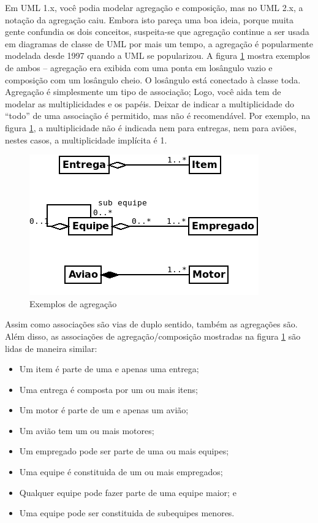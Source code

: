 \documentclass[
	article,			%
	12pt,				%
	openright,
	twoside,			%
	a4paper,			%
	english,			%
	french,
	brazil,				%
	sumario=tradicional
	]{abntex2}
\begin{document}
Em UML 1.x, você podia modelar agregação e composição, mas no UML 2.x, a notação da agregação caiu. Embora isto pareça uma boa ideia, porque muita gente confundia os dois conceitos, suspeita-se que agregação continue a ser usada em diagramas de classe de UML por mais um tempo, a agregação é popularmente modelada desde 1997 quando a UML se popularizou. A figura \ref{fig:uml8} mostra exemplos de ambos -- agregação era exibida com uma ponta em losângulo vazio e composição com um losângulo cheio. O losângulo está conectado à classe toda. Agregação é simplesmente um tipo de associação; Logo, você aida tem de modelar as multiplicidades e os papéis. Deixar de indicar a multiplicidade do ``todo'' de uma associação é permitido, mas não é recomendável. Por exemplo, na figura \ref{fig:uml8}, a multiplicidade não é indicada nem para entregas, nem para aviões, nestes casos, a multiplicidade implícita é 1.

\begin{figure}[h]
\begin{center}
\includegraphics[scale=0.6]{agreg.png} 
\caption{Exemplos de agregação} \label{fig:uml8}
\end{center}\end{figure}

Assim como associações são vias de duplo sentido, também as agregações são. Além disso, as associações de agregação/composição mostradas na figura \ref{fig:uml8} são lidas de maneira similar:
\begin{itemize}
\item Um item é parte de uma e apenas uma entrega;
\item Uma entrega é composta por um ou mais itens;
\item Um motor é parte de um e apenas um avião;
\item Um avião tem um ou mais motores;
\item Um empregado pode ser parte de uma ou mais equipes;
\item Uma equipe é constituida de um ou mais empregados;
\item Qualquer equipe pode fazer parte de uma equipe maior; e
\item Uma equipe pode ser constituida de subequipes menores.
\end{itemize}
\end{document}
